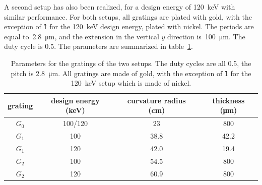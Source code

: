 A second setup has also been realized, for a design energy of
\SI{120}{\kilo\eV} with similar performance. For both setups, all gratings
are plated with gold, with the exception of \G1 for the \SI{120}{\kilo\eV}
design energy, plated with nickel. The periods are equal
to~\SI{2.8}{\micro\metre}, and the extension in the vertical $y$ direction
is~\SI{100}{\micro\metre}. The duty cycle is 0.5. The parameters are
summarized in table~\ref{tab:gratings}.
\begin{table}[htb]
    \centering
    \begin{tabular}{*4c}
        \toprule
        grating & design energy (\si{\kilo\eV}) & curvature radius
        (\si{\centi\metre}) & thickness (\si{\micro\metre}) \\
        \midrule
        $G_0$ & \num{100}/\num{120} & \num{23} & \num{800} \\
        $G_1$ & \num{100} & \num{38.8} & \num{42.2} \\
        $G_1$ & \num{120} & \num{42.0} & \num{19.4} \\
        $G_2$ & \num{100} & \num{54.5} & \num{800} \\
        $G_2$ & \num{120} & \num{60.9} & \num{800} \\
        \bottomrule
    \end{tabular}
    \caption{Parameters for the gratings of the two setups. The duty cycles
        are all \num{0.5}, the pitch is \SI{2.8}{\micro\meter}. All gratings
        are made of gold, with the exception of \G1 for the
        \SI{120}{\kilo\eV} setup which is made of nickel.}
    \label{tab:gratings}
\end{table}

